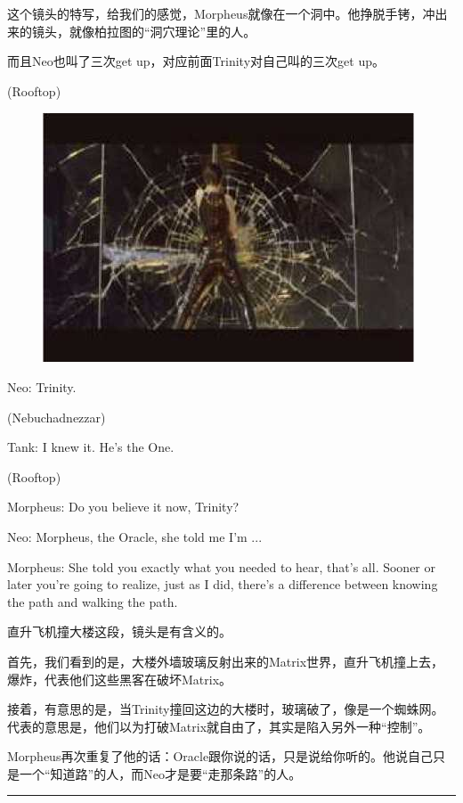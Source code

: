 \documentclass{ctexart}
\newcommand{\myparsep}{\noindent \rule[0.5ex]{\linewidth}{1pt}}
\newenvironment{myquote}{\color{green} \setlength{\leftskip}{6em} \setlength{\rightskip}{4em} \setlength{\parindent}{-2em}}{\par}
\begin{document}
这个镜头的特写，给我们的感觉，Morpheus就像在一个洞中。他挣脱手铐，冲出来的镜头，就像柏拉图的“洞穴理论”里的人。

而且Neo也叫了三次get up，对应前面Trinity对自己叫的三次get up。

\begin{myquote}
(Rooftop)

\begin{figure}[htb]
\centering
\includegraphics[width=0.5\linewidth]{fig/read_Matrix-70}
\end{figure}

Neo: Trinity.

(Nebuchadnezzar)

Tank: I knew it. He's the One.

(Rooftop)

Morpheus: Do you believe it now, Trinity?

Neo: Morpheus, the Oracle, she told me I'm ...

Morpheus: She told you exactly what you needed to hear, that's all. Sooner or later you're going to realize, just as I did, there's a difference between knowing the path and walking the path.
\end{myquote}

直升飞机撞大楼这段，镜头是有含义的。

首先，我们看到的是，大楼外墙玻璃反射出来的Matrix世界，直升飞机撞上去，爆炸，代表他们这些黑客在破坏Matrix。

接着，有意思的是，当Trinity撞回这边的大楼时，玻璃破了，像是一个蜘蛛网。代表的意思是，他们以为打破Matrix就自由了，其实是陷入另外一种“控制”。

Morpheus再次重复了他的话：Oracle跟你说的话，只是说给你听的。他说自己只是一个“知道路”的人，而Neo才是要“走那条路”的人。

\myparsep
\end{document}
